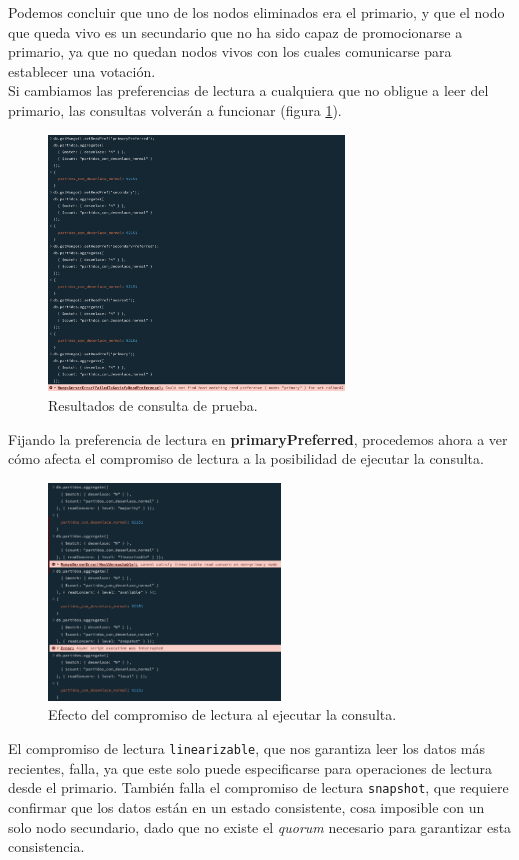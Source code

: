 Podemos concluir que uno de los nodos eliminados era el primario, y que el nodo que queda vivo es un secundario que no ha sido capaz de promocionarse a primario, ya que no quedan nodos vivos con los cuales comunicarse para establecer una votación. \\

Si cambiamos las preferencias de lectura a cualquiera que no obligue a leer del primario, las consultas volverán a funcionar (figura \ref{fig:mongo_prueba}).

\begin{figure}[H]
\centering
\includegraphics[width=0.7\textwidth]{fotos/mongo/readPRefsResults.png}
\caption{Resultados de consulta de prueba.}
\label{fig:mongo_prueba}
\end{figure}

Fijando la preferencia de lectura en \textbf{primaryPreferred}, procedemos ahora a ver cómo afecta el compromiso de lectura a la posibilidad de ejecutar la consulta.

\begin{figure}[H]
\centering
\includegraphics[width=0.55\textwidth]{fotos/mongo/read_concerns.png}
\caption{Efecto del compromiso de lectura al ejecutar la consulta.}
\label{fig:mongo_concerns}
\end{figure}

El compromiso de lectura \texttt{linearizable}, que nos garantiza leer los datos más recientes, falla, ya que este solo puede especificarse para operaciones de lectura desde el primario. También falla el compromiso de lectura \texttt{snapshot}, que requiere confirmar que los datos están en un estado consistente, cosa imposible con un solo nodo secundario, dado que no existe el \textit{quorum} necesario para garantizar esta consistencia.
